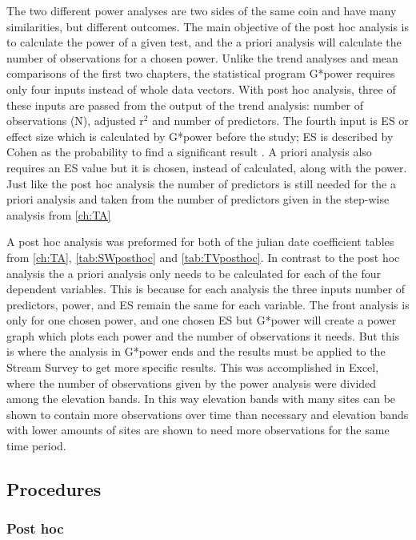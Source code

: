 The two different power analyses are two sides of the same coin and have many similarities, but different outcomes.
The main objective of the post hoc analysis is to calculate the power of a given test, and the a priori analysis will calculate the number of observations for a chosen power.
Unlike the trend analyses and mean comparisons of the first two chapters, the statistical program G*power requires only four inputs instead of whole data vectors.  
With post hoc analysis, three of these inputs are passed from the output of the trend analysis: number of observations (N), adjusted r$^2$ and number of predictors.
The fourth input is ES or effect size which is calculated by G*power before the study; ES is described by Cohen as the probability to find a significant result \citep{cohen1992power}.
A priori analysis also requires an ES value but it is chosen, instead of calculated, along with the power.
Just like the post hoc analysis the number of predictors is still needed for the a priori analysis and taken from the number of predictors given in the step-wise analysis from \autoref{ch:TA}

A post hoc analysis was preformed for both of the julian date coefficient tables from \autoref{ch:TA},  \autoref{tab:SWposthoc} and \autoref{tab:TVposthoc}.
In contrast to the post hoc analysis the a priori analysis only needs to be calculated for each of the four dependent variables.
This is because for each analysis the three inputs number of predictors, power, and ES remain the same for each variable.
The front analysis is only for one chosen power, and one chosen ES but G*power will create a power graph which plots each power and the number of observations it needs.
But this is where the analysis in G*power ends and the results must be applied to the Stream Survey to get more specific results.
This was accomplished in Excel, where the number of observations given by the power analysis were divided among the elevation bands.
In this way elevation bands with many sites can be shown to contain more observations over time than necessary and elevation bands with lower amounts of sites are shown to need more observations for the same time period.

\subsection{Procedures}

\subsubsection{Post hoc}

